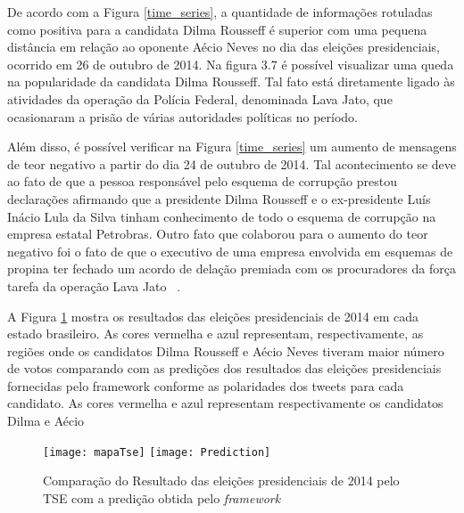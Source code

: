  
De acordo com a Figura \ref{time_series}, a quantidade de informações rotuladas como positiva para a candidata Dilma Rousseff é superior com uma pequena distância em
relação ao oponente Aécio Neves no dia das eleições presidenciais, ocorrido em 26 de outubro de 2014. 
 Na figura 3.7 é possível visualizar uma queda na popularidade da candidata Dilma Rousseff. Tal fato está diretamente ligado às atividades da operação da Polícia Federal, denominada Lava Jato, que ocasionaram a prisão de várias autoridades políticas no período. 

Além disso, é possível verificar na Figura \ref{time_series} um aumento de mensagens de teor negativo a partir do dia 24 de outubro de 2014. Tal acontecimento se deve ao fato de que a pessoa responsável pelo esquema de 
corrupção prestou declarações afirmando que a presidente Dilma Rousseff e o ex-presidente Luís Inácio Lula da Silva tinham conhecimento de todo o esquema de corrupção na empresa estatal Petrobras. Outro fato que colaborou para o aumento do teor negativo foi o fato de que o executivo de uma empresa envolvida em esquemas de propina ter fechado um acordo de delação premiada com os procuradores da força tarefa da operação Lava Jato  ~\cite{LavaJato}. 
 
 
A Figura \ref{eleicoes} mostra os resultados das eleições presidenciais de 2014 em cada estado brasileiro. 
As cores vermelha e azul representam, respectivamente, as regiões onde os candidatos Dilma Rousseff e 
Aécio Neves tiveram maior número de votos comparando com as predições dos resultados das eleições presidenciais fornecidas pelo framework conforme 
as polaridades dos tweets para cada candidato. As cores vermelha e azul representam respectivamente os candidatos Dilma e Aécio

 



 \begin{figure}[tb]
    \begin{center}
        \texttt{[image: mapaTse]} \quad
        \texttt{[image: Prediction]}
    \caption{Comparação do Resultado das eleições presidenciais de 2014 pelo \acrshort{TSE} com a predição obtida pelo \textit{framework}} \label{gdimotes}
    \label{eleicoes}
    \end{center}
    \end{figure}
    
